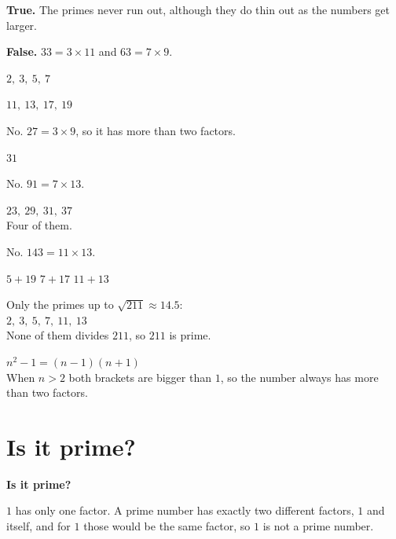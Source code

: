 \documentclass[aspectratio=169]{beamer}
\newcommand{\qtopic}[1]{%
  \section{#1}%
  \begin{frame}
    \vfill
    \begin{center}
      {\usebeamercolor[fg]{structure}\Huge\bfseries #1}
    \end{center}
    \vfill
  \end{frame}%
}
\begin{document}
  {\textbf{True.} The primes never run out,
   although they do thin out as the numbers get larger.}

  {\textbf{False.} $33=3\times 11$ and $63=7\times 9$.}

  {$2,\ 3,\ 5,\ 7$}

  {$11,\ 13,\ 17,\ 19$}

  {No. $27=3\times 9$, so it has more than two factors.}

  {$31$}

  {No. $91=7\times 13$.}

  {$23,\ 29,\ 31,\ 37$\\[0.3em]Four of them.}

  {No. $143=11\times 13$.}

  {$5+19$ \quad $7+17$ \quad $11+13$}

  {Only the primes up to $\sqrt{211}\approx 14.5$:\\[0.3em]
   $2,\ 3,\ 5,\ 7,\ 11,\ 13$\\[0.3em]
   None of them divides $211$, so $211$ is prime.}

  {$n^2-1=(n-1)(n+1)$\\[0.3em]
   When $n>2$ both brackets are bigger than $1$,
   so the number always has more than two factors.}

\qtopic{Is it prime?}


  {$1$ has only one factor. A prime number has exactly two different factors, $1$ and itself, and for $1$ those would be the same factor, so $1$ is not a prime number.}
\end{document}
